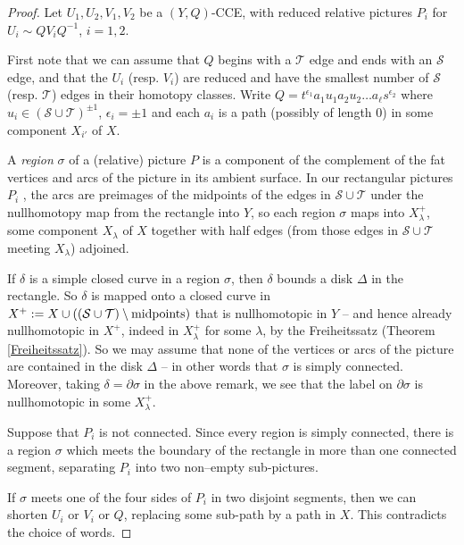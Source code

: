 \documentclass[12pt,a4paper]{amsart}
\def\cS{\mathcal{S}}
\def\cT{\mathcal{T}}
\begin{document}
	\begin{proof}
		Let $U_1,U_2,V_1,V_2$  be a $(Y,Q)$-CCE, with reduced relative pictures $P_i$ for
		 $U_i\sim QV_iQ^{-1}$, $i=1,2$.
	 
		First note that we can assume that $Q$ begins with a $\cT$ edge and ends with an $\cS$ edge,
		and that the $U_i$ (resp. $V_i$) are reduced and have the smallest number of $\cS$ 
		(resp. $\cT$) edges in their homotopy classes. 		Write $Q=t^{\epsilon_1}a_1u_1a_2u_2\dots a_\ell s^{\epsilon_2}$ where
		$u_i\in (\cS\cup\cT)^{\pm 1}$, $\epsilon_i=\pm 1$ and
		each $a_i$ is a path (possibly of length $0$) in some component $X_{i'}$ of $X$.
		
A {\em region} $\sigma$ of a (relative) picture $P$ is a component of the complement of the fat vertices and arcs of the picture in its ambient surface.  	In our rectangular pictures $P_i$ , 
	the arcs are preimages of the midpoints of the 
	edges in $\cS\cup\cT$ under the nullhomotopy map from the rectangle into $Y$, so each region $\sigma$ maps into  
	$X_\lambda^+$,
	some component $X_{\lambda}$ of $X$ together with 
	half edges (from those edges in $\cS\cup\cT$ meeting $X_{\lambda}$) adjoined.

If $\delta$ is a simple closed curve in a region $\sigma$, 
then $\delta$ bounds a disk $\Delta$ in the rectangle.  
So $\delta$ is mapped onto a closed curve in $X^+:=X\cup((\cS\cup\cT) \setminus {\rm midpoints})$ that is nullhomotopic in $Y$ -- and hence already nullhomotopic in $X^+$, 
indeed in $X_\lambda^+$ for some $\lambda$, by the Freiheitssatz (Theorem \ref{Freiheitssatz}).  So we may assume that none of the vertices or arcs of the picture are contained in the disk $\Delta$ -- in other words that $\sigma$ is simply connected.  Moreover, taking $\delta=\partial\sigma$ in the above remark, we see that the label on $\partial\sigma$ is nullhomotopic in some $X_\lambda^+$. 

	Suppose that $P_i$ is not connected.	Since every region is simply connected,  there is a region $\sigma$ which meets the boundary of the rectangle 
in more than one connected segment,
		separating $P_i$ into two non--empty sub-pictures.
		
			If $\sigma$ meets one of the four sides of $P_i$ in two disjoint segments, 
		then we can shorten $U_i$  or $V_i$ or $Q$, replacing some sub-path by a path in $X$.  This contradicts the choice of words.
		


\end{proof}
\end{document}
